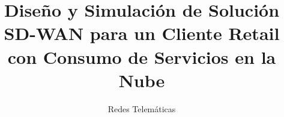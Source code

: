 \documentclass[
  docdegree=phd,        %
  school=nova/fct,      %
  lang=pt,              %
  fontstyle=kpfonts,    %
  chapstyle=elegant,    %
  otherlistsat=front,   %
  secondcover=false,     %
  aftercover=false,     %
  linkscolor=darkblue,  %
  printcommittee=true,  %
  spine=false,          %
  cdcover=false,         %
  biblatex={            %
    backend=bibtex,     %
    style=numeric-comp, %
    sortcites=true,     %
    sorting=nyt,        %
    maxbibnames=99,     %
    giveninits=true,    %
    hyperref=true       %
  },
  memoir={              %
    a4paper,            %
    11pt,               %
    final,              %
  },
  media=screen,         %
]{novathesis}
\title[DISEÑO Y SIMULACIÓN DE SOLUCIÓN SD-WAN PARA UN CLIENTE RETAIL\\CON CONSUMO DE SERVICIOS EN LA NUBE]{Diseño y Simulación de Solución SD-WAN para un Cliente Retail con Consumo de Servicios en la Nube}
\subtitle{Redes Telemáticas}
\begin{document}
\thesisfrontmatter  %
\printcoverpage    %
\printaftercover
\printcopyright    %
\printdedicatory  %
\printacknowledgements  %
\printquote        %
\printabstract    %
\printtoc         %
\printotherlists   %


\thesismainmatter  %
\printchapthers    %
\printbib    %
\printotherlists   %
\printotherlists   %
\printappendixes  %
\printannexes  %
\printbackcoverpage
\end{document}
